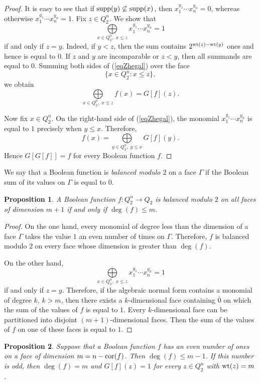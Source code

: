 \documentclass[11pt]{article}
\newtheorem{claim}{Proposition}[section]
\theoremstyle{definition}
\newcommand{\supp}{{\rm supp}}
\newcommand{\wt}{{\rm wt}}
\newcommand{\cor}{{\rm cor}}
\begin{document}
{{{\begin{proof}
It is easy to see that if
$\supp(y)\not\subseteq\supp(x)$, then
$x_1^{y_1}\cdots x_n^{y_n}=0$,
whereas otherwise
$
x_1^{y_1}\cdots x_n^{y_n}=1$.
Fix $z\in Q_2^n$. We show that
\[
\bigoplus\limits_{x\in Q_2^n,\;x\leq z}
x_1^{y_1}\cdots x_n^{y_n}=1
\]
if and only if $z=y$. Indeed, if $y<z$, then the sum contains
$2^{\wt(z)-\wt(y)}$ ones and hence is equal to $0$. If $z$ and $y$
are incomparable or $z<y$, then all summands are equal to $0$.
Summing both sides of (\ref{eqZhegal}) over the face
\[
\{x\in Q_2^n:x\leq z\},
\]
we obtain
\[
\bigoplus\limits_{x\in Q_2^n,\;x\leq z}f(x)=G[f](z).
\]

Now fix $x\in Q_2^n$. On the right-hand side of (\ref{eqZhegal}),
the monomial
$x_1^{y_1}\cdots x_n^{y_n}$ is equal to $1$ precisely when
$y\leq x$. Therefore,
\[
f(x)=\bigoplus\limits_{y\in Q_2^n,\;y\leq x}G[f](y).
\]
Hence
$G[G[f]]=f $
for every Boolean function $f$.
\end{proof}

We say that a Boolean function is {\sl balanced modulo $2$} on a
face $\Gamma$ if the Boolean sum of its values on $\Gamma$ is equal
to $0$.

\begin{claim}\label{stsp1}
A Boolean function $f:Q_2^n\rightarrow Q_2$ is balanced modulo $2$
on all faces of dimension $m+1$ if and only if
$\deg(f)\leq m$.
\end{claim}
\begin{proof}
On the one hand, every monomial of degree less than the dimension of
a face $\Gamma$ takes the value $1$ an even number of times on
$\Gamma$. Therefore, $f$ is balanced modulo $2$ on every face whose
dimension is greater than $\deg(f)$.

On the other hand,
\[
\bigoplus\limits_{x\in Q_2^n,\;x\leq z}
x_1^{y_1}\cdots x_n^{y_n}=1
\]
if and only if $z=y$. Therefore, if the algebraic normal form
contains a monomial of degree $k$, $k>m$, then there exists a
$k$-dimensional face containing $\bar 0$ on which the sum of the
values of $f$ is equal to $1$.  Every $k$-dimensional face
can be partitioned into  disjoint $(m+1)$-dimensional faces.  Then  the sum of the
values of $f$ on one of these faces is equal to $1$. 
\end{proof}

\begin{claim}\label{stsp2}%
Suppose that a Boolean function $f$ has an even number of ones on a
face of dimension
$m=n-\cor(f)$.
Then
$\deg(f)\leq m-1$.
If this number is odd, then
$\deg(f)=m$
and
$G[f](z)=1$
for every $z\in Q_2^n$ with $\wt(z)=m$.
\end{claim}

}}}
\end{document}
